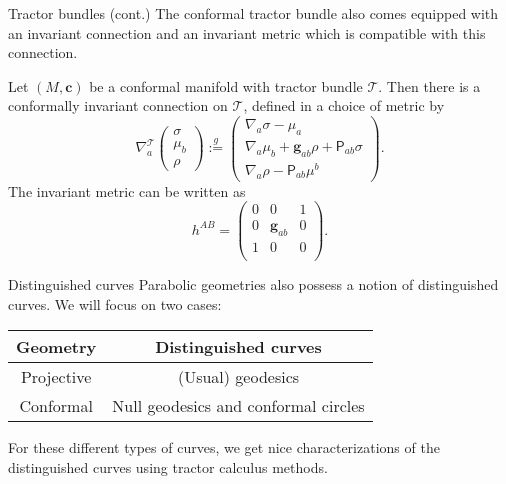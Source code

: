 \documentclass[handout]{beamer}
\newcommand{\confmet}{\bm{g}}
\begin{document}
\begin{frame}{Tractor bundles (cont.)}
  The conformal tractor bundle also comes equipped with an invariant connection and an invariant metric which is compatible with this connection.
  \pause
  \begin{Theorem}
    Let \( (M, \bm{c}) \) be a conformal manifold with tractor bundle \( \mathcal{T} \).
    Then there is a conformally invariant connection on \( \mathcal{T} \), defined in a choice of metric by
    \pause
    \[
      \nabla_a^{\mathcal{T}}
      \begin{pmatrix}
        \sigma \\ 
        \mu_b \\ 
        \rho
      \end{pmatrix}
      \overset{g}{:= }
      \begin{pmatrix}
        \nabla_a\sigma - \mu_a \\ 
        \nabla_a\mu_b + \confmet_{ab} \rho + \mathsf{P}_{ab} \sigma \\ 
        \nabla_a \rho - \mathsf{P}_{ab} \mu^b
      \end{pmatrix}.
    \]
    \pause
    The invariant metric can be written as 
    \[
      h^{AB} = 
      \begin{pmatrix}
      0 & 0 & 1 \\
      0 & \confmet_{ab} & 0\\
      1 & 0 & 0\\
      \end{pmatrix}.
    \]
  \end{Theorem}
\end{frame}

\begin{frame}{Distinguished curves}
  Parabolic geometries also possess a notion of distinguished curves.
  We will focus on two cases: \\
  \begin{center}
    \begin{tabular}{ | c | c | }
      \hline
      Geometry & Distinguished curves \\ \hline
      Projective & (Usual) geodesics \\ \hline 
      Conformal & Null geodesics and conformal circles \\
      \hline
    \end{tabular}
  \end{center}
  \pause 
  For these different types of curves, we get nice characterizations of the distinguished curves using tractor calculus methods.
\end{frame}
\end{document}

